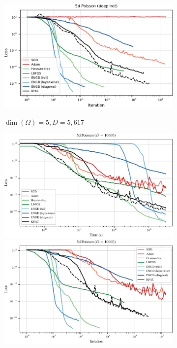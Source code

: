 \begin{figure}[!h]
\begin{subfigure}{0.325\linewidth}
    \\
    \includegraphics[width=\linewidth]{../kfac_pinns_exp/exp12_poisson5d_deep/loss_over_step}
    \caption{$\dim(\Omega) = 5, D = 5,617$}
  \end{subfigure}
  \hfill
  \begin{subfigure}{0.325\linewidth}
    \includegraphics[width=\linewidth]{../kfac_pinns_exp/exp16_poisson5d_deepwide/loss_over_time}
    \\
    \includegraphics[width=\linewidth]{../kfac_pinns_exp/exp16_poisson5d_deepwide/loss_over_step}

\end{subfigure}
\end{figure}

